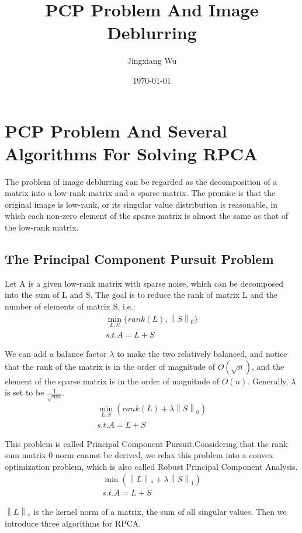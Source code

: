 \documentclass[UTF8]{report}
\title{\Huge \textbf{PCP Problem And Image Deblurring}}
\author{Jingxiang Wu}
\date{\today}
\begin{document}
\large
\maketitle
\tableofcontents
\chapter{PCP Problem And Several Algorithms For Solving RPCA}
The problem of image deblurring can be regarded as the decomposition of a matrix into a low-rank matrix and a sparse matrix. The premise is that the original image is low-rank, or its singular value distribution is reasonable, in which each non-zero element of the sparse matrix is almost the same as that of the low-rank matrix.
\section{The Principal Component Pursuit Problem}

Let A is a given low-rank matrix with sparse noise, which can be decomposed into the sum of L and S. The goal is to reduce the rank of matrix L and the number of elements of matrix S, i.e.:
\[\begin{array}{l}
\min_{L,S}\{ rank(L),{\left\| S \right\|_0}\}\\
s.t.     A = L + S
\end{array}\]

We can add a balance factor \(\lambda \) to make the two relatively balanced, and notice that the rank of the matrix is in the order of magnitude of \(O(\sqrt n )\), and the element of the sparse matrix is in the order of magnitude of \(O(n)\). Generally, \(\lambda \) is set to be \(\frac{1}{{\sqrt {mn} }}\).
\[\begin{array}{l}
\min_{L,S}(rank(L) + \lambda {\left\| S \right\|_0})\\
s.t.     A = L + S
\end{array}\]

This problem is called Principal Component Pursuit.Considering that the rank sum matrix 0 norm cannot be derived, we relax this problem into a convex optimization problem, which is also called Robust Principal Component Analysis.
\[\begin{array}{l}
\min ({\left\| L \right\|_*} + \lambda {\left\| S \right\|_1})\\
s.t.A = L + S
\end{array}\]

\({\left\| L \right\|_*}\) is the kernel norm of a matrix, the sum of all singular values. Then we introduce three algorithms for RPCA.
\end{document}

